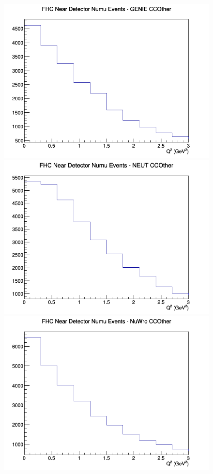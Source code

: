 \documentclass[12pt]{article}
\begin{document}
\begin{figure}[h]
\endminipage
\newline
{}
\includegraphics[width=\linewidth]{eff_Q2/FGT/CCOther_FHC_ND_numu_Q2_GENIE.png}
\endminipage
{}
\includegraphics[width=\linewidth]{eff_Q2/FGT/CCOther_FHC_ND_numu_Q2_NEUT.png}
\endminipage
{}
\includegraphics[width=\linewidth]{eff_Q2/FGT/CCOther_FHC_ND_numu_Q2_NuWro.png}

\end{figure}
\end{document}

